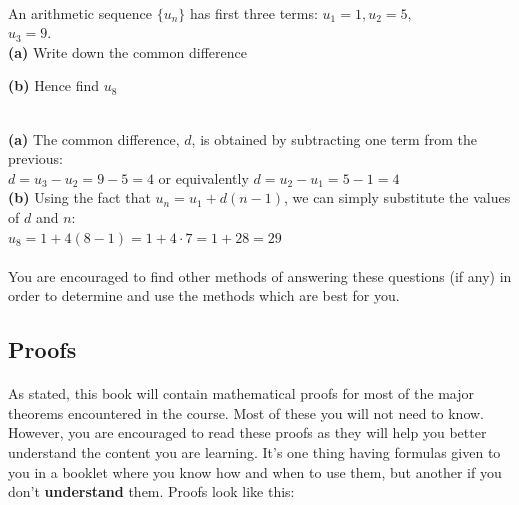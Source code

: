 \documentclass[12pt, a4paper, titlepage, twoside]{article}
\begin{document}
	
	\begin{ex}
		\hfill \\
		An arithmetic sequence $\{u_n\}$ has first three terms: $u_1 = 1, u_2 = 5,$ \\ $u_3 = 9$.\\
		
		\textbf{(a)} Write down the common difference
		
		\textbf{(b)} Hence find $u_8$\\
		
		\tcbline
		
		\hfill \\
		\textbf{(a)} The common difference, $d$, is obtained by subtracting one term from the previous:\\
		$d = u_3 - u_2 = 9 - 5 = 4$ or equivalently $d = u_2 - u_1 = 5 - 1 = 4$\\
		
		\textbf{(b)} Using the fact that $u_n = u_1 + d(n-1)$, we can simply substitute the values of $d$ and $n$:\\
		$u_8 = 1 + 4(8-1) = 1 + 4 \cdot 7 = 1 + 28 = 29$
		
	\end{ex}
	
	\paragraph{}
	You are encouraged to find other methods of answering these questions (if any) in order to determine and use the methods 
	which are best for you.
	
	\subsection*{Proofs}
	
	\paragraph{}
	As stated, this book will contain mathematical proofs for most of the major theorems encountered in the course. Most of these
	you will not need to know. However, you are encouraged to read these proofs as they will help you better understand the content
	you are learning. It's one thing having formulas given to you in a booklet where you know how and when to use them, but another
	if you don't \textbf{understand} them. Proofs look like this:\\
	
\end{document}

